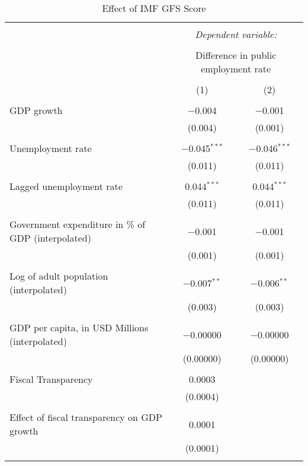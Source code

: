 
\begin{table}[!htbp] \centering 
  \caption{Effect of IMF GFS Score} 
  \label{} 
\begin{tabular}{@{\extracolsep{5pt}}lcc} 
\\[-1.8ex]\hline 
\hline \\[-1.8ex] 
 & \multicolumn{2}{c}{\textit{Dependent variable:}} \\ 
\cline{2-3} 
\\[-1.8ex] & \multicolumn{2}{c}{Difference in public employment rate} \\ 
\\[-1.8ex] & (1) & (2)\\ 
\hline \\[-1.8ex] 
 GDP growth & $-$0.004 & $-$0.001 \\ 
  & (0.004) & (0.001) \\ 
  & & \\ 
 Unemployment rate & $-$0.045$^{***}$ & $-$0.046$^{***}$ \\ 
  & (0.011) & (0.011) \\ 
  & & \\ 
 Lagged unemployment rate & 0.044$^{***}$ & 0.044$^{***}$ \\ 
  & (0.011) & (0.011) \\ 
  & & \\ 
 Government expenditure in \% of GDP (interpolated) & $-$0.001 & $-$0.001 \\ 
  & (0.001) & (0.001) \\ 
  & & \\ 
 Log of adult population (interpolated) & $-$0.007$^{**}$ & $-$0.006$^{**}$ \\ 
  & (0.003) & (0.003) \\ 
  & & \\ 
 GDP per capita, in USD Millions (interpolated) & $-$0.00000 & $-$0.00000 \\ 
  & (0.00000) & (0.00000) \\ 
  & & \\ 
 Fiscal Transparency & 0.0003 &  \\ 
  & (0.0004) &  \\ 
  & & \\ 
 Effect of fiscal transparency on GDP growth & 0.0001 &  \\ 
  & (0.0001) &  \\ 
  & & \\ 

\end{tabular}
\end{table}
